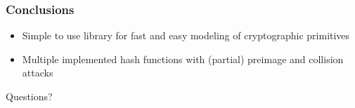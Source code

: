 \documentclass{beamer}
\let\olditem\item
\renewcommand{\item}{%
\olditem\vspace{4pt}}
\begin{document}
\begin{frame}
\frametitle{Conclusions}
\begin{itemize}
\item Simple to use library for fast and easy modeling of cryptographic primitives
\item Multiple implemented hash functions with (partial) preimage and collision attacks
\end{itemize}
\end{frame}

\begin{frame}
\begin{center}
Questions?
\end{center}
\end{frame}


%
%
\end{document}
